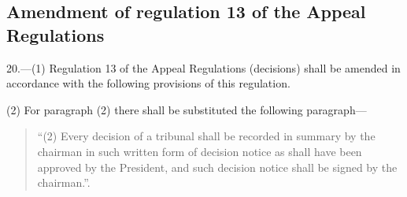 \documentclass[a4paper]{article}
\begin{document}
\subsection[20. Amendment of regulation 13 of the Appeal Regulations]{Amendment of regulation 13 of the Appeal Regulations}

20.—(1) Regulation 13 of the Appeal Regulations (decisions) shall be amended in accordance with the following provisions of this regulation.

(2) For paragraph (2) there shall be substituted the following paragraph—
\begin{quotation}
“(2) Every decision of a tribunal shall be recorded in summary by the chairman in such written form of decision notice as shall have been approved by the President, and such decision notice shall be signed by the chairman.”.
\end{quotation}
\end{document}
